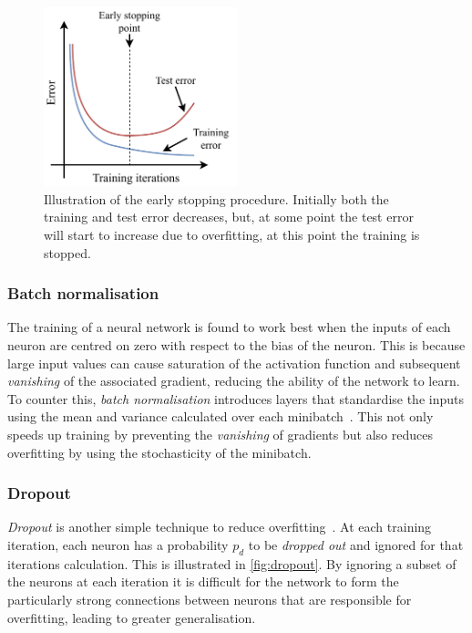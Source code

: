 \begin{figure} %
    \includegraphics[width=0.5\textwidth]{diagrams/6-cnn/early_stopping.pdf}
    \caption[Illustration of the early stopping procedure]
    {Illustration of the early stopping procedure. Initially both the training and test error
        decreases, but, at some point the test error will start to increase due to overfitting, at
        this point the training is stopped.}
    \label{fig:early_stopping}
\end{figure}

\subsubsection*{Batch normalisation} %

The training of a neural network is found to work best when the inputs of each neuron are centred
on zero with respect to the bias of the neuron. This is because large input values can cause
saturation of the activation function and subsequent \emph{vanishing} of the associated gradient,
reducing the ability of the network to learn. To counter this, \emph{batch normalisation}
introduces layers that standardise the inputs using the mean and variance calculated over each
minibatch~\cite{ioffe2015}. This not only speeds up training by preventing the \emph{vanishing} of
gradients but also reduces overfitting by using the stochasticity of the minibatch.

\subsubsection*{Dropout} %

\emph{Dropout} is another simple technique to reduce overfitting~\cite{hinton2012}. At each
training iteration, each neuron has a probability $p_{d}$ to be \emph{dropped out} and ignored for
that iterations calculation. This is illustrated in \ref{fig:dropout}. By ignoring a subset of the
neurons at each iteration it is difficult for the network to form the particularly strong
connections between neurons that are responsible for overfitting, leading to greater
generalisation.

